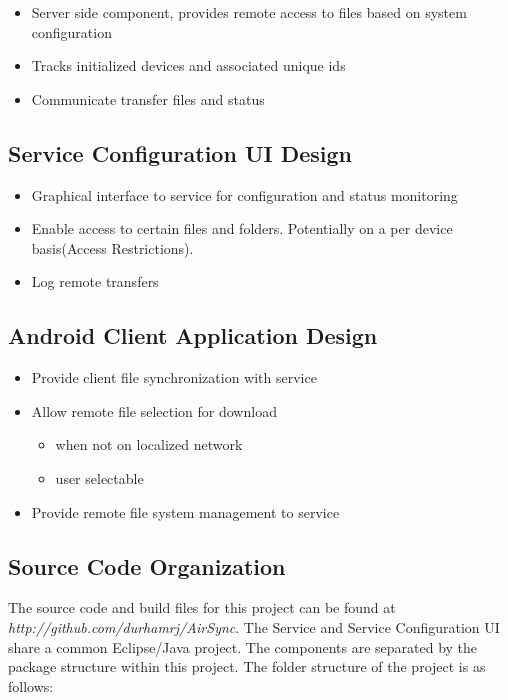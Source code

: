 \documentclass[12pt]{article}
\begin{document}
\begin{itemize}
\item Server side component, provides remote access to files based on system configuration
\item Tracks initialized devices and associated unique ids
\item Communicate transfer files and status 
\end{itemize}

\subsection{Service Configuration UI Design}

\begin{itemize}
\item Graphical interface to service for configuration and status monitoring
\item Enable access to certain files and folders.  Potentially on a per device basis(Access Restrictions).
\item Log remote transfers
\end{itemize}

\subsection{Android Client Application Design}

\begin{itemize}
\item Provide client file synchronization with service
\item Allow remote file selection for download 
	\begin{itemize}
	\item when not on localized network
	\item user selectable
	\end {itemize}
\item Provide remote file system management to service
\end{itemize}

\subsection{Source Code Organization}
The source code and build files for this project can be found at\\ \emph{http://github.com/durhamrj/AirSync}. The Service and Service Configuration UI share a common Eclipse/Java project. The components are separated by the package structure within this project. The  folder structure of the project is as follows:
\end{document}
